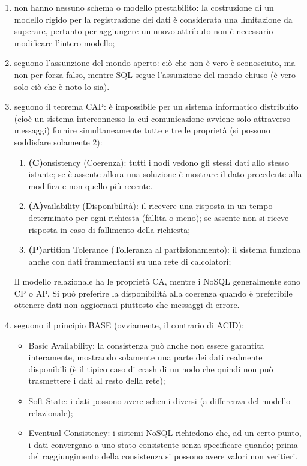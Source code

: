 \documentclass[a4page, 11pt]{article}
\begin{document}
\begin{enumerate}[noitemsep]
\item non hanno nessuno schema o modello prestabilito: la costruzione di un modello rigido per la registrazione dei dati è considerata una limitazione da superare, pertanto per aggiungere un nuovo attributo non è necessario modificare l'intero modello;
\item seguono l'assunzione del mondo aperto: ciò che non è vero è sconosciuto, ma non per forza falso, mentre SQL segue l'assunzione del mondo chiuso (è vero solo ciò che è noto lo sia).
\item seguono il teorema CAP: è impossibile per un sistema informatico distribuito (cioè un sistema interconnesso la cui comunicazione avviene solo attraverso messaggi) fornire simultaneamente tutte e tre le proprietà (si possono soddisfare solamente 2):
  \begin{enumerate}
  \item \textbf{(C)}onsistency (Coerenza): tutti i nodi vedono gli stessi dati allo stesso istante; se è assente allora una soluzione è mostrare il dato precedente alla modifica e non quello più recente.
  \item \textbf{(A)}vailability (Disponibilità): il ricevere una risposta in un tempo determinato per ogni richiesta (fallita o meno); se assente non si riceve risposta in caso di fallimento della richiesta;
  \item \textbf{(P)}artition Tolerance (Tolleranza al partizionamento): il sistema funziona anche con dati frammentanti su una rete di calcolatori;
  \end{enumerate}
  Il modello relazionale ha le proprietà CA, mentre i NoSQL generalmente sono CP o AP.
  Si può preferire la disponibilità alla coerenza quando è preferibile ottenere dati non aggiornati piuttosto che messaggi di errore.
\item seguono il principio BASE (ovviamente, il contrario di ACID):
  \begin{itemize}
  \item Basic Availability: la consistenza può anche non essere garantita interamente, mostrando solamente una parte dei dati realmente disponibili (è il tipico caso di crash di un nodo che quindi non può trasmettere i dati al resto della rete);
  \item Soft State: i dati possono avere schemi diversi (a differenza del modello relazionale);
  \item Eventual Consistency: i sistemi NoSQL richiedono che, ad un certo punto, i dati convergano a uno stato consistente senza specificare quando; prima del raggiungimento della consistenza si possono avere valori non veritieri.
  \end{itemize}
\end{enumerate}
\end{document}
